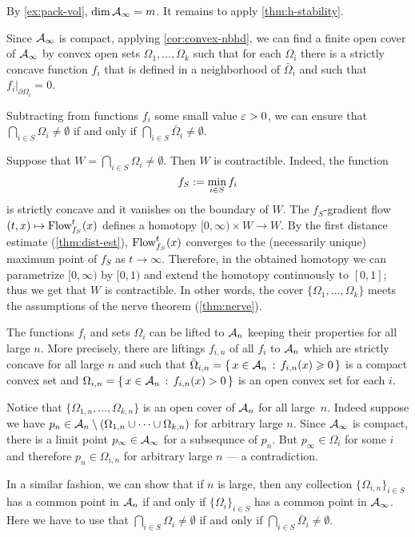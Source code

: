 By \ref{ex:pack-vol}, $\operatorname{\rm dim}\nolimits \mathcal{A}_\infty=m$.
It remains to apply \ref{thm:h-stability}.
\qeds

Since $\mathcal{A}_\infty$ is compact, applying \ref{cor:convex-nbhd}, we can find a finite open cover of $\mathcal{A}_\infty$ by convex open sets $\Omega_1,\dots, \Omega_k$ such that 
for each $\Omega_i$ there is a strictly concave function $f_i$ that is defined in a neighborhood of $\bar \Omega_i$ and such that $f_i|_{\partial \Omega_i}=0$.

Subtracting from functions $f_i$ some small value $\varepsilon>0$,
we can ensure that $\bigcap_{i\in S}\Omega_{i}\ne \emptyset$ if and only if $\bigcap_{i\in S}\bar\Omega_{i}\ne \emptyset$.

Suppose that $W=\bigcap_{i\in S}\Omega_{i}\ne \emptyset$.
Then $W$ is contractible.
Indeed, the function 
\[f_S\mathrel{:=}\min_{i\in S} f_i\]
is strictly concave and it vanishes on the boundary of $W$.
The $f_S$-gradient flow $(t,x)\mapsto \mathop{\rm Flow}\nolimits_{f_S}^t(x)$ defines a homotopy
$[0,\infty)\times W\to W$.
By the first distance estimate (\ref{thm:dist-est}), $\mathop{\rm Flow}\nolimits_{f_S}^t(x)$ converges to the (necessarily unique) maximum point of $f_S$ as $t\to\infty$.
Therefore, in the obtained homotopy we can parametrize $[0,\infty)$ by $[0,1)$ and extend the homotopy continuously to $[0,1]$;
thus we get that $W$ is contractible.
In other words, the cover $\{\Omega_1,\dots, \Omega_k\}$ meets the assumptions of the nerve theorem (\ref{thm:nerve}).

The functions $f_i$ and sets $\Omega_i$ can be lifted to $\mathcal{A}_n$ keeping their properties for all large $n$. 
More precisely, there are liftings $f_{i,n}$ of all $f_i$ to $\mathcal{A}_n$ which are strictly concave for all large $n$ and such that $\bar\Omega_{i,n}=\left\{\,{x\in \mathcal{A}_n}\,:\,{f_{i,n}(x)\geqslant 0}\,\right\}$ is a compact convex set and $\Omega_{i,n}=\left\{\,{x\in \mathcal{A}_n}\,:\,{f_{i,n}(x)> 0}\,\right\}$ is an open convex set for each $i$.

Notice that $\{\Omega_{1,n},\dots,\Omega_{k,n}\}$ is an open cover of $\mathcal{A}_n$ for all large~$n$.
Indeed suppose we have $p_n\in \mathcal{A}_n\setminus(\Omega_{1,n}\cup\dots\cup\Omega_{k,n})$ for arbitrary large $n$.
Since $\mathcal{A}_\infty$ is compact, there is a limit point $p_\infty\in \mathcal{A}_\infty$ for a subsequnce of $p_n$.
But $p_\infty\in\Omega_i$ for some $i$ and therefore $p_n\in \Omega_{i,n}$ for arbitrary large $n$ --- a contradiction.

In a similar fashion, we can show that if $n$ is large, then any collection $\{\Omega_{i,n}\}_{i\in S}$ has a common point in $\mathcal{A}_n$ 
if and only if $\{\Omega_{i}\}_{i\in S}$ has a common point in $\mathcal{A}_\infty$.
Here we have to use that $\bigcap_{i\in S}\Omega_{i}\ne \emptyset$ if and only if $\bigcap_{i\in S}\bar\Omega_{i}\ne \emptyset$.

